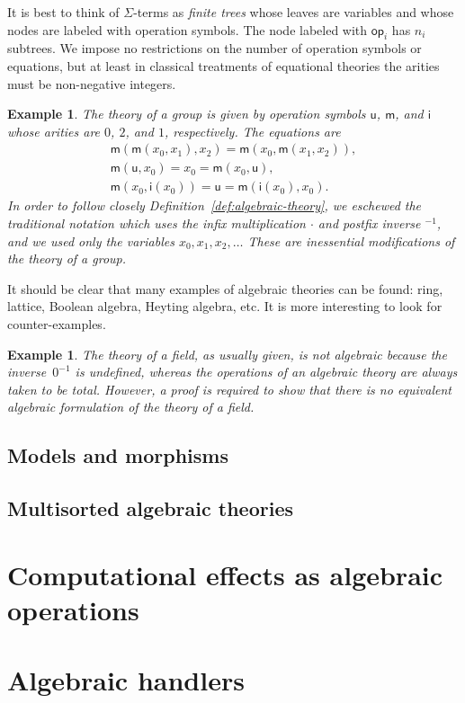 \documentclass{amsart}
\newcommand{\op}{\mathsf{op}}
\newtheorem{example}[definition]{Example}
\begin{document}
It is best to think of $\Sigma$-terms as \emph{finite trees} whose leaves are variables
and whose nodes are labeled with operation symbols. The node labeled with $\op_i$ has
$n_i$ subtrees. We impose no restrictions on the number of operation symbols or equations,
but at least in classical treatments of equational theories the arities must be
non-negative integers.

\begin{example}
  The theory of a group is given by operation symbols $\mathsf{u}$, $\mathsf{m}$, and
  $\mathsf{i}$ whose arities are $0$, $2$, and $1$, respectively. The equations are
  \begin{gather*}
    \mathsf{m}(\mathsf{m}(x_0, x_1), x_2) = \mathsf{m}(x_0, \mathsf{m}(x_1, x_2)),\\
    \mathsf{m}(\mathsf{u}, x_0) = x_0 = \mathsf{m}(x_0, \mathsf{u}),\\
    \mathsf{m}(x_0, \mathsf{i}(x_0)) = \mathsf{u} = \mathsf{m}(\mathsf{i}(x_0), x_0).
  \end{gather*}
  In order to follow closely Definition~\ref{def:algebraic-theory}, we eschewed the
  traditional notation which uses the infix multiplication $\cdot$ and postfix inverse
  ${}^{-1}$, and we used only the variables $x_0, x_1, x_2, \ldots$ These are
  inessential modifications of the theory of a group.
\end{example}

It should be clear that many examples of algebraic theories can be found: ring, lattice,
Boolean algebra, Heyting algebra, etc. It is more interesting to look for
counter-examples.

\begin{example}
  The theory of a field, as usually given, is not algebraic because the inverse~$0^{-1}$
  is undefined, whereas the operations of an algebraic theory are always taken to be
  total. However, a proof is required to show that there is no equivalent algebraic
  formulation of the theory of a field.
\end{example}

\subsection{Models and morphisms}
\label{sec:models-and-morphisms}


\subsection{Multisorted algebraic theories}
\label{sec:mult-algebr-theor}

\section{Computational effects as algebraic operations}
\label{sec:comp-effects-as}

\section{Algebraic handlers}
\label{sec:algebraic-handlers}
\end{document}
